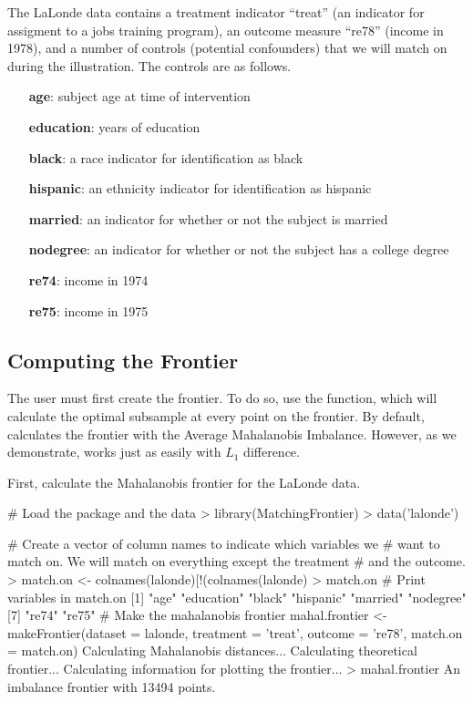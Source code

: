 \documentclass[nojss]{jss}
\begin{document}
The LaLonde data contains a treatment indicator ``treat'' (an
indicator for assigment to a jobs training program), an outcome
measure ``re78'' (income in 1978), and a number of controls (potential
confounders) that we will match on during the illustration. The
controls are as follows.

\begin{itemize}
  \item[\textbf{age}:] subject age at time of intervention
  \item[\textbf{education}:] years of education
  \item[\textbf{black}:] a race indicator for identification as black
  \item[\textbf{hispanic}:] an ethnicity indicator for identification as hispanic
  \item[\textbf{married}:] an indicator for whether or not the subject is married
  \item[\textbf{nodegree}:] an indicator for whether or not the subject has a college degree
  \item[\textbf{re74}:] income in 1974
  \item[\textbf{re75}:] income in 1975
\end{itemize}

\subsection{Computing the Frontier}

The user must first create the frontier. To do so, use the
 function, which will calculate the optimal
subsample at every point on the frontier. By default,
 calculates the frontier with the Average
Mahalanobis Imbalance. However, as we demonstrate,
 works just as easily with $L_1$ difference.

First, calculate the Mahalanobis frontier for the LaLonde
data.

\begin{CodeChunk}
\begin{CodeInput}
# Load the package and the data
> library(MatchingFrontier)
> data('lalonde')

# Create a vector of column names to indicate which variables we 
# want to match on. We will match on everything except the treatment
# and the outcome.
> match.on <- colnames(lalonde)[!(colnames(lalonde) %
> match.on # Print variables in match.on
[1] "age"       "education" "black"     "hispanic"  "married"   "nodegree" 
[7] "re74"      "re75"     
# Make the mahalanobis frontier
mahal.frontier <- makeFrontier(dataset = lalonde, 
                            treatment = 'treat', 
                            outcome = 're78', 
                            match.on = match.on)
Calculating Mahalanobis distances...
Calculating theoretical frontier...
Calculating information for plotting the frontier...
> mahal.frontier
An imbalance frontier with 13494 points.
\end{CodeInput}
\end{CodeChunk}
\end{document}
